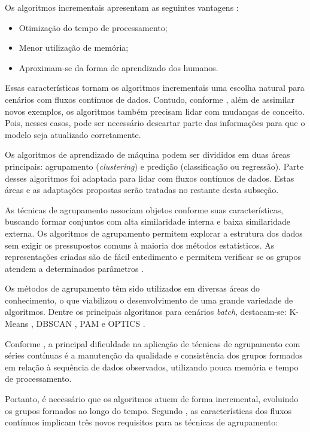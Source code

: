 \documentclass[qual, classic, a4paper]{ufbathesis}
\begin{document}
Os algoritmos incrementais apresentam as seguintes vantagens \cite{pinto2005algoritmos}:

\begin{itemize}
    \item Otimização do tempo de processamento;
    \item Menor utilização de memória;
    \item Aproximam-se da forma de aprendizado dos humanos.
\end{itemize}

Essas características tornam os algoritmos incrementais uma escolha natural para cenários com fluxos contínuos de dados.
Contudo, conforme \cite{GamaMCR04}, além de assimilar novos exemplos, os algoritmos também precisam lidar com mudanças de conceito.
Pois, nesses casos, pode ser necessário descartar parte das informações para que o modelo seja atualizado corretamente.

Os algoritmos de aprendizado de máquina podem ser divididos em duas áreas principais: agrupamento (\textit{clustering}) e predição (classificação ou regressão).
Parte desses algoritmos foi adaptada para lidar com fluxos contínuos de dados.
Estas áreas e as adaptações propostas serão tratadas no restante desta subseção.

As técnicas de agrupamento associam objetos conforme suas características, buscando formar conjuntos com alta similaridade interna e baixa similaridade externa.
Os algoritmos de agrupamento permitem explorar a estrutura dos dados sem exigir os pressupostos comuns à maioria dos métodos estatísticos.
As representações criadas são de fácil entedimento e permitem verificar se os grupos atendem a determinados parâmetros \cite{Jain:1988:ACD:46712}.

Os métodos de agrupamento têm sido utilizados em diversas áreas do conhecimento, o que viabilizou o desenvolvimento de uma grande variedade de algoritmos.
Dentre os principais algoritmos para cenários \textit{batch}, destacam-se:
K-Means \cite{Lloyd:2006:LSQ:2263356.2269955},
DBSCAN \cite{Ester:1996:DAD:3001460.3001507},
PAM \cite{kaufman:clustering1990} e 
OPTICS \cite{Ankerst:1999:OOP:304181.304187}.

Conforme \cite{Gama:2010:KDD:1855075}, a principal dificuldade na aplicação de técnicas de agrupamento com séries contínuas é 
a manutenção da qualidade e consistência dos grupos formados em relação à sequência de dados observados, utilizando pouca memória e tempo de processamento. 

Portanto, é necessário que os algoritmos atuem de forma incremental, evoluindo os grupos formados ao longo do tempo.
Segundo \cite{Barbara:2002:RCD:507515.507519}, as características dos fluxos contínuos implicam três novos requisitos para as técnicas de agrupamento:
\end{document}
